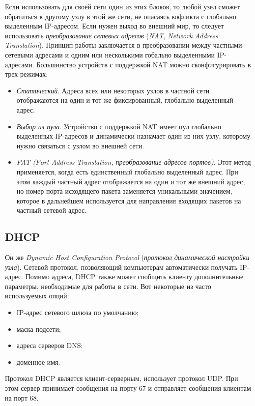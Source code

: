 Если использовать для своей сети один из этих блоков, то любой узел сможет обратиться к другому узлу в этой же сети, не опасаясь кофликта с глобально выделенным IP-адресом. Если нужен выход во внешний мир, то следует использовать \emph{преобразование сетевых адресов} (\emph{NAT}, \emph{Network Address Translation}). Принцип работы заключается в преобразовании между частными сетевыми адресами и одним или несколькими гобально выделенными IP-адресами. Большинство устройств с поддержкой NAT можно сконфигурировать в трех режимах:
\begin{itemize}
  \item \emph{Статический}. Адреса всех или некоторых узлов в частной сети отображаются на один и тот же фиксированный, глобально выделенный адрес.
  \item \emph{Выбор из пула}. Устройство с поддержкой NAT имеет пул глобально выделенных IP-адресов и динамически назначает один из них узлу, которому нужно связаться с узлом во внешней сети.
  \item \emph{PAT (Port Address Translation, преобразование адресов портов)}. Этот метод применяется, когда есть единственный глобально выделенный адрес. При этом каждый частный адрес отображается на один и тот же внешний адрес, но номер порта исходящего пакета заменяется уникальными значением, которое в дальнейшем используется для направления входящих пакетов на частный сетевой адрес.
\end{itemize}

\subsection{DHCP}
Он же \emph{Dynamic Host Configuration Protocol} (\emph{протокол динамической настройки узла}). Сетевой протокол, позволяющий компьютерам автоматически получать IP-адрес. Помимо адреса, DHCP также может сообщить клиенту дополнительные параметры, необходимые для работы в сети. Вот некоторые из часто используемых опций:
\begin{itemize}
  \item IP-адрес сетевого шлюза по умолчанию;
  \item маска подсети;
  \item адреса серверов DNS;
  \item доменное имя.
\end{itemize}

Протокол DHCP является клиент-серверным, использует протокол UDP. При этом сервер принимает сообщения на порту 67 и отправляет сообщения клиентам на порт 68.

